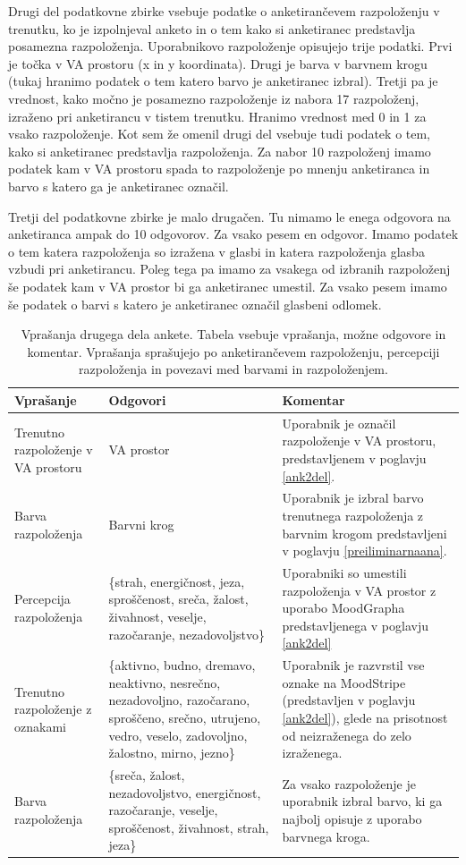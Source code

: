 \documentclass[a4paper, 12pt]{book}
\begin{document}
{Drugi del podatkovne zbirke vsebuje podatke o anketirančevem razpoloženju v trenutku, ko je izpolnjeval anketo in o tem kako si anketiranec predstavlja posamezna razpoloženja. Uporabnikovo razpoloženje opisujejo trije podatki. Prvi je točka v VA prostoru (x in y koordinata). Drugi je barva v barvnem krogu (tukaj hranimo podatek o tem katero barvo je  anketiranec izbral). Tretji pa je vrednost, kako močno je posamezno razpoloženje iz nabora 17 razpoloženj, izraženo pri anketirancu v tistem trenutku. Hranimo vrednost med 0 in 1 za vsako razpoloženje. Kot sem že omenil drugi del vsebuje tudi podatek o tem, kako si anketiranec predstavlja razpoloženja. Za nabor 10 razpoloženj imamo podatek kam v VA prostoru spada to razpoloženje po mnenju anketiranca in barvo s katero ga je anketiranec označil. 

Tretji del podatkovne zbirke je malo drugačen. Tu nimamo le enega odgovora na anketiranca ampak do 10 odgovorov. Za vsako pesem en odgovor. Imamo podatek o tem katera razpoloženja so izražena v glasbi in katera razpoloženja glasba vzbudi pri anketirancu. Poleg tega pa imamo za vsakega od izbranih razpoloženj še podatek kam v VA prostor bi ga anketiranec umestil. Za vsako pesem imamo še podatek o barvi s katero je anketiranec označil glasbeni odlomek.  

\begin{table}[H]
\begin{center}
\caption{Vprašanja drugega dela ankete. Tabela vsebuje vprašanja, možne odgovore in komentar. Vprašanja sprašujejo po anketirančevem razpoloženju, percepciji razpoloženja in povezavi med barvami in razpoloženjem.}
\begin{tabular}{| p{3.5cm} | p{4.5cm} | p{4.5cm} |}
\hline
Vprašanje & Odgovori & Komentar \\ \hline \hline
Trenutno razpoloženje v VA prostoru & VA prostor & Uporabnik je označil razpoloženje v VA prostoru, predstavljenem v poglavju \ref{ank2del}. \\ \hline
Barva razpoloženja & Barvni krog & Uporabnik je izbral barvo trenutnega razpoloženja z barvnim krogom predstavljeni v poglavju \ref{preiliminarnaana}. \\ \hline
Percepcija razpoloženja & \{strah, energičnost, jeza, sproščenost, sreča, žalost, živahnost, veselje, razočaranje, nezadovoljstvo\} & Uporabniki so umestili razpoloženja v VA prostor z uporabo MoodGrapha predstavljenega v poglavju \ref{ank2del} \\ \hline
Trenutno razpoloženje z oznakami & \{aktivno, budno, dremavo, neaktivno, nesrečno, nezadovoljno, razočarano, sproščeno, srečno, utrujeno, vedro, veselo, zadovoljno, žalostno, mirno, jezno\} & Uporabnik je razvrstil vse oznake na MoodStripe (predstavljen v poglavju \ref{ank2del}), glede na prisotnost od neizraženega do zelo izraženega. \\ \hline
Barva razpoloženja & \{sreča, žalost, nezadovoljstvo, energičnost, razočaranje, veselje, sproščenost, živahnost, strah, jeza\} & Za vsako razpoloženje je uporabnik izbral barvo, ki ga najbolj opisuje z uporabo barvnega kroga. \\ \hline


\end{tabular}
\end{center}
\end{table}}
\end{document}
